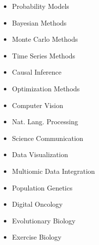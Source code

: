\documentclass[11pt,margin,line]{resume}
\begin{document}
\begin{resume}
\vspace{-0.0mm}
\begin{multicols}{3}
    \begin{itemize}
    \setlength\itemsep{-0.2em}
         \item Probability Models
	\item Bayesian Methods
         \item Monte Carlo Methods
	\item Time Series Methods
         \item Causal Inference
         \item Optimization Methods
         \item Computer Vision
         \item Nat. Lang. Processing
         \item Science Communication
         \item Data Visualization
         \item Multiomic Data Integration
         \item Population Genetics
         \item Digital Oncology
         \item Evolutionary Biology
         \item Exercise Biology
         
    \end{itemize}
    \end{multicols}\vspace{-4.5mm}


\end{resume}
\end{document}
